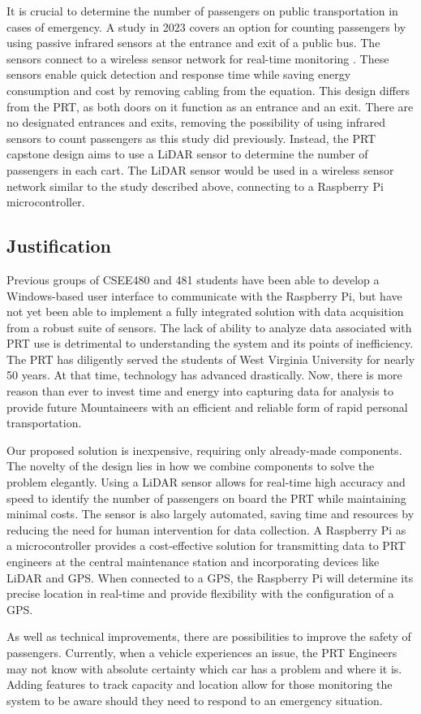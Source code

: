 It is crucial to determine the number of passengers on public transportation in cases of emergency. A study in 2023 covers an option for counting passengers by using passive infrared sensors at the entrance and exit of a public bus. The sensors connect to a wireless sensor network for real-time monitoring \cite{Jurak_Osman_Sikirić_Šimunović_2023}. These sensors enable quick detection and response time while saving energy consumption and cost by removing cabling from the equation. This design differs from the PRT, as both doors on it function as an entrance and an exit. There are no designated entrances and exits, removing the possibility of using infrared sensors to count passengers as this study did previously. Instead, the PRT capstone design aims to use a LiDAR sensor to determine the number of passengers in each cart. The LiDAR sensor would be used in a wireless sensor network similar to the study described above, connecting to a Raspberry Pi microcontroller.

\subsection{Justification}
Previous groups of CSEE480 and 481 students have been able to develop a Windows-based user interface to communicate with the Raspberry Pi, but have not yet been able to implement a fully integrated solution with data acquisition from a robust suite of sensors. The lack of ability to analyze data associated with PRT use is detrimental to understanding the system and its points of inefficiency. The PRT has diligently served the students of West Virginia University for nearly 50 years. At that time, technology has advanced drastically. Now, there is more reason than ever to invest time and energy into capturing data for analysis to provide future Mountaineers with an efficient and reliable form of rapid personal transportation.

Our proposed solution is inexpensive, requiring only already-made components. The novelty of the design lies in how we combine components to solve the problem elegantly. Using a LiDAR sensor allows for real-time high accuracy and speed to identify the number of passengers on board the PRT while maintaining minimal costs. The sensor is also largely automated, saving time and resources by reducing the need for human intervention for data collection. A Raspberry Pi as a microcontroller provides a cost-effective solution for transmitting data to PRT engineers at the central maintenance station and incorporating devices like LiDAR and GPS. When connected to a GPS, the Raspberry Pi will determine its precise location in real-time and provide flexibility with the configuration of a GPS.

As well as technical improvements, there are possibilities to improve the safety of passengers. Currently, when a vehicle experiences an issue, the PRT Engineers may not know with absolute certainty which car has a problem and where it is. Adding features to track capacity and location allow for those monitoring the system to be aware should they need to respond to an emergency situation.
